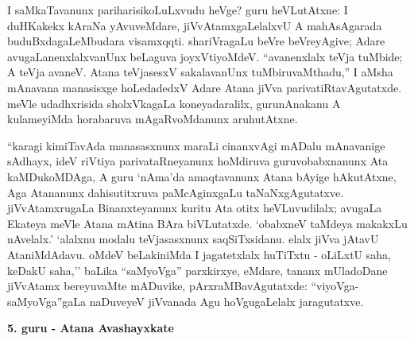I saMkaTavanunx pariharisikoLuLxvudu heVge? guru heVLutAtxne: I duHKakekx kAraNa yAvuveMdare, jiVvAtamxgaLelalxvU A mahAsAgarada buduBxdagaLeMbudara visamxqqti. shariVragaLu beVre beVreyAgive; Adare avugaLanenxlalxvanUnx beLaguva joyxVtiyoMdeV. ``avanenxlalx teVja tuMbide; A teVja avaneV. Atana teVjasesxV sakalavanUnx tuMbiruvaMthadu,'' I aMsha mAnavana manasisxge hoLedadedxV Adare Atana jiVva parivatiRtavAgutatxde. meVle udadhxrisida sholxVkagaLa koneyadaralilx, gurunAnakanu A kulameyiMda horabaruva mAgaRvoMdanunx aruhutAtxne.

``karagi kimiTavAda manasasxnunx maraLi cinanxvAgi mADalu mAnavanige sAdhayx, ideV riVtiya parivataRneyanunx hoMdiruva guruvobabxnanunx Ata kaMDukoMDAga, A guru `nAma'da amaqtavanunx Atana bAyige hAkutAtxne, Aga Atananunx dahisutitxruva paMcAginxgaLu taNaNxgAgutatxve. jiVvAtamxrugaLa Binanxteyanunx kuritu Ata otitx heVLuvudilalx; avugaLa Ekateya meVle Atana mAtina BAra biVLutatxde. `obabxneV taMdeya makakxLu nAvelalx.' `alalxnu modalu teVjasasxnunx saqSiTxsidanu. elalx jiVva jAtavU AtaniMdAdavu. oMdeV beLakiniMda I jagatetxlalx huTiTxtu - oLiLxtU saha, keDakU saha,'' baLika ``saMyoVga'' parxkirxye, eMdare, tananx mUladoDane jiVvAtamx bereyuvaMte mADuvike, pArxraMBavAgutatxde: ``viyoVga-saMyoVga''gaLa naDuveyeV jiVvanada Agu hoVgugaLelalx jaragutatxve.

\bigskip
\begin{center}
{\Large\bf 5. guru - Atana Avashayxkate}
\end{center}

